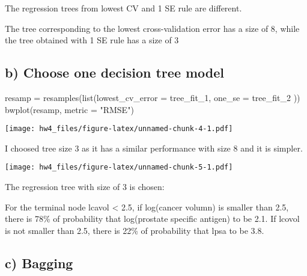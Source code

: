 \documentclass[
]{article}
\newenvironment{Shaded}{\begin{snugshade}}{\end{snugshade}}
\newcommand{\AttributeTok}[1]{\textcolor[rgb]{0.77,0.63,0.00}{#1}}
\newcommand{\FunctionTok}[1]{\textcolor[rgb]{0.00,0.00,0.00}{#1}}
\newcommand{\NormalTok}[1]{#1}
\newcommand{\OtherTok}[1]{\textcolor[rgb]{0.56,0.35,0.01}{#1}}
\newcommand{\SpecialCharTok}[1]{\textcolor[rgb]{0.00,0.00,0.00}{#1}}
\newcommand{\StringTok}[1]{\textcolor[rgb]{0.31,0.60,0.02}{#1}}
\begin{document}
The regression trees from lowest CV and 1 SE rule are different.

The tree corresponding to the lowest cross-validation error has a size
of 8, while the tree obtained with 1 SE rule has a size of 3

\hypertarget{b-choose-one-decision-tree-model}{%
\subsection{b) Choose one decision tree
model}\label{b-choose-one-decision-tree-model}}

\begin{Shaded}
\begin{Highlighting}[]
\NormalTok{resamp }\OtherTok{=} \FunctionTok{resamples}\NormalTok{(}\FunctionTok{list}\NormalTok{(}\AttributeTok{lowest\_cv\_error =}\NormalTok{ tree\_fit\_1, }
                         \AttributeTok{one\_se =}\NormalTok{ tree\_fit\_2}
\NormalTok{                         ))}
\FunctionTok{bwplot}\NormalTok{(resamp, }\AttributeTok{metric =} \StringTok{"RMSE"}\NormalTok{)}
\end{Highlighting}
\end{Shaded}

\texttt{[image: hw4\_files/figure-latex/unnamed-chunk-4-1.pdf]}

I choosed tree size 3 as it has a similar performance with size 8 and it
is simpler.

\begin{Shaded}
\end{Shaded}

\texttt{[image: hw4\_files/figure-latex/unnamed-chunk-5-1.pdf]}

The regression tree with size of 3 is chosen:

For the terminal node lcavol \textless{} 2.5, if log(cancer volumn) is
smaller than 2.5, there is 78\% of probability that log(prostate
specific antigen) to be 2.1. If lcovol is not smaller than 2.5, there is
22\% of probability that lpsa to be 3.8.

\hypertarget{c-bagging}{%
\subsection{c) Bagging}\label{c-bagging}}
\end{document}
